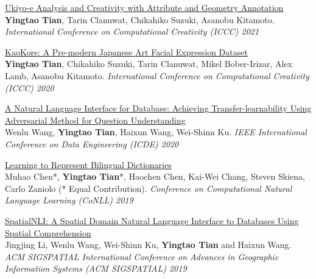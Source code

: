 \documentclass[line,margin]{cv}
\begin{document}
\begin{resume}
{  \begin{samepage}
  \href{https://arxiv.org/abs/2106.02267}{Ukiyo-e Analysis and Creativity with Attribute and Geometry Annotation}\\
  \textbf{Yingtao Tian}, Tarin Clanuwat, Chikahiko Suzuki, Asanobu Kitamoto. \emph{International Conference on Computational Creativity (ICCC) 2021}
  \par\end{samepage}

  \begin{samepage}
  \href{https://arxiv.org/abs/2002.08595}{KaoKore: A Pre-modern Japanese Art Facial Expression Dataset}\\
  \textbf{Yingtao Tian}, Chikahiko Suzuki, Tarin Clanuwat, Mikel Bober-Irizar, Alex Lamb, Asanobu Kitamoto. \emph{International Conference on Computational Creativity (ICCC) 2020}
  \par\end{samepage}

  \begin{samepage}
  \href{https://ieeexplore.ieee.org/document/9101534}{A Natural Language Interface for Database: Achieving Transfer-learnability Using Adversarial Method for Question Understanding}\\
  Wenlu Wang, \textbf{Yingtao Tian}, Haixun Wang, Wei-Shinn Ku. \emph{IEEE International Conference on Data Engineering (ICDE) 2020}
  \par\end{samepage}

  \begin{samepage}
  \href{https://arxiv.org/abs/1808.03726}{Learning to Represent Bilingual Dictionaries}\\
  Muhao Chen*, \textbf{Yingtao Tian}*, Haochen Chen, Kai-Wei Chang, Steven Skiena, Carlo Zaniolo (* Equal Contribution). \emph{Conference on Computational Natural Language Learning (CoNLL) 2019}
  \par\end{samepage}

  \begin{samepage}
  \href{https://arxiv.org/abs/1908.10917}{SpatialNLI: A Spatial Domain Natural Language Interface to Databases Using Spatial Comprehension}\\
  Jingjing Li, Wenlu Wang, Wei-Shinn Ku, \textbf{Yingtao Tian} and Haixun Wang. \emph{ACM SIGSPATIAL International Conference on Advances in Geographic Information Systems (ACM SIGSPATIAL) 2019}
  \par\end{samepage}

}
\end{resume}
\end{document}
